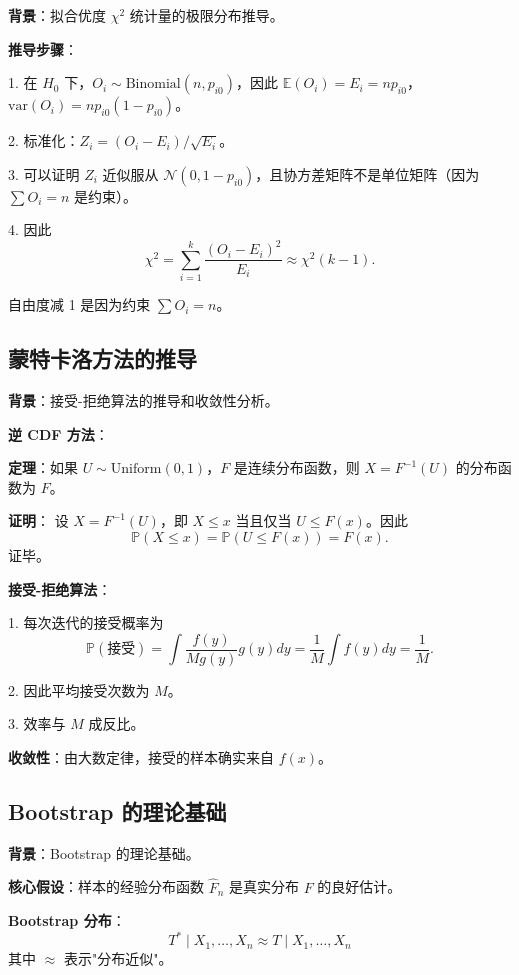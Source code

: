 \textbf{背景}：拟合优度 $\chi^2$ 统计量的极限分布推导。

\textbf{推导步骤}：

1. 在 $H_0$ 下，$O_i \sim \mathrm{Binomial}(n, p_{i0})$，因此 $\mathbb{E}(O_i) = E_i = np_{i0}$，$\text{var}(O_i) = np_{i0}(1-p_{i0})$。

2. 标准化：$Z_i = (O_i - E_i)/\sqrt{E_i}$。

3. 可以证明 $Z_i$ 近似服从 $\mathcal{N}(0, 1-p_{i0})$，且协方差矩阵不是单位矩阵（因为 $\sum O_i = n$ 是约束）。

4. 因此
\[
\chi^2 = \sum_{i=1}^{k} \frac{(O_i - E_i)^2}{E_i} \approx \chi^2(k-1).
\]

自由度减 1 是因为约束 $\sum O_i = n$。

\subsection{蒙特卡洛方法的推导}\label{sec:derivation-monte-carlo}

\textbf{背景}：接受-拒绝算法的推导和收敛性分析。

\textbf{逆 CDF 方法}：

\textbf{定理}：如果 $U \sim \mathrm{Uniform}(0,1)$，$F$ 是连续分布函数，则 $X = F^{-1}(U)$ 的分布函数为 $F$。

\textbf{证明}：
设 $X = F^{-1}(U)$，即 $X \leq x$ 当且仅当 $U \leq F(x)$。因此
\[
\mathbb{P}(X \leq x) = \mathbb{P}(U \leq F(x)) = F(x).
\]
证毕。

\textbf{接受-拒绝算法}：

1. 每次迭代的接受概率为
\[
\mathbb{P}(\text{接受}) = \int \frac{f(y)}{Mg(y)} g(y) dy = \frac{1}{M}\int f(y) dy = \frac{1}{M}.
\]

2. 因此平均接受次数为 $M$。

3. 效率与 $M$ 成反比。

\textbf{收敛性}：由大数定律，接受的样本确实来自 $f(x)$。

\subsection{Bootstrap 的理论基础}\label{sec:derivation-bootstrap}

\textbf{背景}：Bootstrap 的理论基础。

\textbf{核心假设}：样本的经验分布函数 $\widehat{F}_n$ 是真实分布 $F$ 的良好估计。

\textbf{Bootstrap 分布}：
\[
T^* \mid X_1, \ldots, X_n \approx T \mid X_1, \ldots, X_n
\]
其中 $\approx$ 表示"分布近似"。

